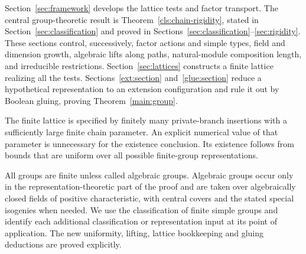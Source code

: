Section~\ref{sec:framework} develops the lattice tests and factor
transport. The central group-theoretic result is
Theorem~\ref{cls:chain-rigidity}, stated in
Section~\ref{sec:classification} and proved in
Sections~\ref{sec:classification}--\ref{sec:rigidity}.
These sections control, successively, factor actions and simple types,
field and dimension growth, algebraic lifts along paths,
natural-module composition length, and irreducible restrictions.
Section~\ref{sec:lattices} constructs a finite lattice realizing all
the tests. Sections~\ref{ext:section} and~\ref{glue:section} reduce a
hypothetical representation to an extension configuration and rule
it out by Boolean gluing, proving Theorem~\ref{main:group}.

The finite lattice is specified by finitely many private-branch
insertions with a sufficiently large finite chain parameter.
An explicit numerical value of that parameter is unnecessary for the
existence conclusion. Its existence follows from bounds that are
uniform over all possible finite-group representations.

All groups are finite unless called algebraic groups. Algebraic
groups occur only in the representation-theoretic part of the proof
and are taken over algebraically closed fields of positive
characteristic, with central covers and the stated special isogenies
when needed. We use the classification of finite simple groups and
identify each additional classification or representation input at
its point of application. The new uniformity, lifting, lattice
bookkeeping and gluing deductions are proved explicitly.
